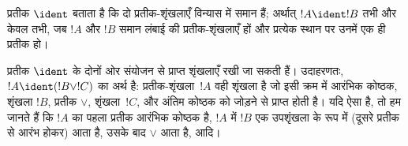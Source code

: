 \documentclass[../../../include/open-logic-section]{subfiles}
\begin{document}
\begin{defn}[वाक्यविन्यासगत समानता]
प्रतीक $\ident$ बताता है कि दो प्रतीक-शृंखलाएँ विन्यास में समान हैं;
अर्थात् $!A \ident !B$ तभी और केवल तभी, जब $!A$ और $!B$ समान लंबाई की
प्रतीक-शृंखलाएँ हों और प्रत्येक स्थान पर उनमें एक ही प्रतीक हो।
\end{defn}

प्रतीक $\ident$ के दोनों ओर संयोजन से प्राप्त शृंखलाएँ रखी जा सकती हैं।
उदाहरणतः, $!A \ident (!B \lor !C)$ का अर्थ है: प्रतीक-शृंखला~$!A$ वही
शृंखला है जो इसी क्रम में आरंभिक कोष्ठक, शृंखला $!B$, प्रतीक $\lor$,
शृंखला~$!C$, और अंतिम कोष्ठक को जोड़ने से प्राप्त होती है। यदि ऐसा है, तो
हम जानते हैं कि $!A$ का पहला प्रतीक आरंभिक कोष्ठक है, $!A$ में $!B$ एक
उपशृंखला के रूप में (दूसरे प्रतीक से आरंभ होकर) आता है, उसके बाद $\lor$
आता है, आदि।
\end{document}
